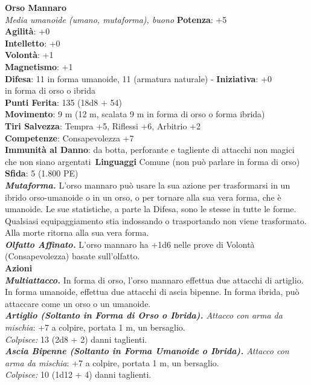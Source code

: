 \begin{multicols}{2}
\medskip\textbf{Orso Mannaro}\\
\emph{Media umanoide (umano, mutaforma), buono}
\textbf{Potenza}: +5\\
\textbf{Agilità}: +0\\
\textbf{Intelletto}: +0\\
\textbf{Volontà}: +1\\
\textbf{Magnetismo}: +1\\
\textbf{Difesa}: 11 in forma umanoide, 11 (armatura naturale) - \textbf{Iniziativa}: +0\\
in forma di orso o ibrida\\
\textbf{Punti Ferita}: 135 (18d8 + 54)\\
\textbf{Movimento}: 9 m (12 m, scalata 9 m in forma di orso o forma ibrida) \\
\textbf{Tiri Salvezza}:  Tempra +5, Riflessi +6, Arbitrio +2\\
\textbf{Competenze}: Consapevolezza +7\\
\textbf{Immunità al Danno}: da botta, perforante e tagliente di attacchi non magici che non siano argentati\
\textbf{Linguaggi} Comune (non può parlare in forma di orso)\\
\textbf{Sfida}: 5 (1.800 PE)\smallskip\\
\emph{\textbf{Mutaforma.}} L'orso mannaro può usare la sua azione per trasformarsi in un ibrido orso-umanoide o in un orso, o per tornare alla sua vera forma, che è umanoide. Le sue statistiche, a parte la Difesa, sono le stesse in tutte le forme. Qualsiasi equipaggiamento stia indossando o trasportando non viene trasformato. Alla morte ritorna alla sua vera forma.\\
\emph{\textbf{Olfatto Affinato.}} L'orso mannaro ha +1d6 nelle prove di Volontà (Consapevolezza) basate sull'olfatto.\\
\smallskip\textbf{Azioni}\\
\emph{\textbf{Multiattacco.}} In forma di orso, l'orso mannaro effettua due attacchi di artiglio. In forma umanoide, effettua due attacchi di ascia bipenne. In forma ibrida, può attaccare come un orso o un umanoide.\\

\emph{\textbf{Artiglio (Soltanto in Forma di Orso o Ibrida).} Attacco con arma da mischia}: +7 a colpire, portata 1 m, un bersaglio.\\
\emph{Colpisce:} 13 (2d8 + 2) danni taglienti.\\

\emph{\textbf{Ascia Bipenne (Soltanto in Forma Umanoide o Ibrida).} Attacco con arma da mischia}: +7 a colpire, portata 1 m, un bersaglio.\\
\emph{Colpisce:} 10 (1d12 + 4) danni taglienti.\\


\end{multicols}
